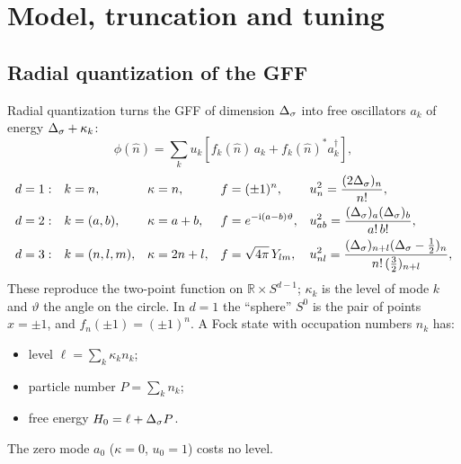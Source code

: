 \section{Model, truncation and tuning}\label{ht:sec:model}

\subsection{Radial quantization of the GFF}
Radial quantization turns the GFF of dimension $\Delta_\sigma$ into free oscillators $a_k$ of energy $\Delta_\sigma+\kappa_k$:
\begin{equation}
 \phi(\hat n)=\sum_k u_k\left[f_k(\hat n)\,a_k+f_k(\hat n)^*a_k^\dagger\right],
 \label{ht:eq:modes}
\end{equation}
\begin{equation}
\begin{aligned}
 d=1:&\quad k=n,&&\kappa=n,&&f=(\pm1)^n,&&u_n^2=\frac{(2\Delta_\sigma)_n}{n!},\\
 d=2:&\quad k=(a,b),&&\kappa=a+b,&&f=e^{-\mathrm i(a-b)\vartheta},&&u_{ab}^2=\frac{(\Delta_\sigma)_a(\Delta_\sigma)_b}{a!\,b!},\\
 d=3:&\quad k=(n,l,m),&&\kappa=2n+l,&&f=\sqrt{4\pi}\,Y_{lm},&&u_{nl}^2=\frac{(\Delta_\sigma)_{n+l}(\Delta_\sigma-\frac12)_n}{n!\,(\frac32)_{n+l}},
\end{aligned}
\label{ht:eq:weights}
\end{equation}
These reproduce the two-point function on $\mathbb R\times S^{d-1}$; $\kappa_k$ is the level of mode $k$ and
$\vartheta$ the angle on the circle. In $d=1$ the ``sphere'' $S^0$ is the pair of points $x=\pm1$, and
$f_n(\pm1)=(\pm1)^n$. A Fock state with occupation numbers $n_k$ has:
\begin{itemize}
\item level $\ell=\sum_k\kappa_k n_k$;
\item particle number $P=\sum_k n_k$;
\item free energy $H_0=\ell+\Delta_\sigma P$.
\end{itemize}
The zero mode $a_0$ ($\kappa=0$, $u_0=1$) costs no level.

